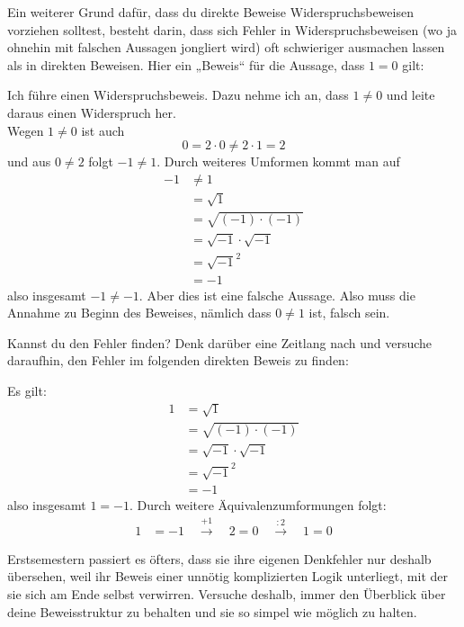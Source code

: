   
  \begin{bsp}[*]
   Ein weiterer Grund dafür, dass du direkte Beweise Widerspruchsbeweisen vorziehen solltest, besteht darin, dass sich Fehler in Widerspruchsbeweisen (wo ja ohnehin mit falschen Aussagen jongliert wird) oft schwieriger ausmachen lassen als in direkten Beweisen. Hier ein „Beweis“ für die Aussage, dass $1=0$ gilt:
   \begin{bew}
Ich führe einen Widerspruchsbeweis. Dazu nehme ich an, dass $1\neq 0$ und leite daraus einen Widerspruch her. \\
Wegen $1\neq 0$ ist auch
\[ 0 = 2\cdot 0 \neq 2\cdot 1 = 2 \]
und aus $0\neq 2$ folgt $-1\neq 1$. Durch weiteres Umformen kommt man auf
\begin{align*}
-1 & \neq 1 \\
 & = \sqrt{1} \\
 & = \sqrt{(-1)\cdot (-1)} \\
 & = \sqrt{-1} \cdot \sqrt{-1} \\
 & = \sqrt{-1}^2 \\
 & = -1
\end{align*}
also insgesamt $-1\neq -1$. Aber dies ist eine falsche Aussage. Also muss die Annahme zu Beginn des Beweises, nämlich dass $0\neq 1$ ist, falsch sein. 
   \end{bew}
Kannst du den Fehler finden? Denk darüber eine Zeitlang nach und versuche daraufhin, den Fehler im folgenden direkten Beweis  zu finden:
\begin{bew}
 Es gilt:
 \begin{align*}
  1 & = \sqrt{1} \\
  & = \sqrt{(-1)\cdot (-1)} \\
  & = \sqrt{-1}\cdot \sqrt{-1} \\
  & = \sqrt{-1}^2 \\
  & = -1
 \end{align*}
 also insgesamt $1=-1$. Durch weitere Äquivalenzumformungen folgt:
 \begin{align*}
  1 & = -1 \quad\xrightarrow{+1}\quad 2=0 \quad\xrightarrow{:2}\quad 1=0 
 \end{align*}
\end{bew}
Erstsemestern passiert es öfters, dass sie ihre eigenen Denkfehler nur deshalb übersehen, weil ihr Beweis einer unnötig komplizierten Logik unterliegt, mit der sie sich am Ende selbst verwirren. Versuche deshalb, immer den Überblick über deine Beweisstruktur zu behalten und sie so simpel wie möglich zu halten.
  \end{bsp}
  
